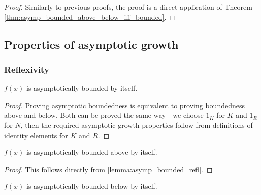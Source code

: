 \begin{proof}
    \leanok
    Similarly to previous proofs, the proof is a direct application of Theorem 
    \ref{thm:asymp_bounded_above_below_iff_bounded}.
\end{proof}


\subsection{Properties of asymptotic growth}

\subsubsection{Reflexivity}

\begin{lemma}
    \label{lemma:asymp_bounded_refl}
    \leanok
    $f(x)$ is asymptotically bounded by itself. 

\end{lemma}

\begin{proof}
    \leanok
    Proving asymptotic boundedness is equivalent to proving boundedness above and below.
    Both can be proved the same way - we choose $1_K$ for $K$ and $1_R$ for $N$, then the
    required asymptotic growth properties follow from definitions of identity elements for 
    $K$ and $R$.
\end{proof}

\begin{lemma}
    \label{lemma:asymp_bounded_above_refl}
    \leanok
    $f(x)$ is asymptotically bounded above by itself.

\end{lemma}

\begin{proof}
    \leanok
    This follows directly from \ref{lemma:asymp_bounded_refl}.
\end{proof}

\begin{lemma}
    \label{lemma:asymp_bounded_below_refl}
    \leanok
    $f(x)$ is asymptotically bounded below by itself.

\end{lemma}

